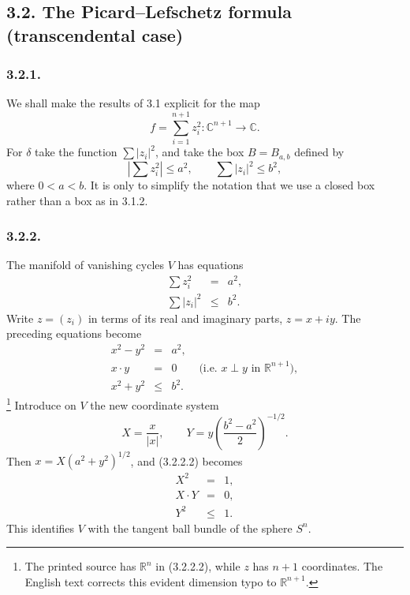 \subsection*{3.2. The Picard--Lefschetz formula (transcendental case)}

\subsubsection*{3.2.1.}
We shall make the results of 3.1 explicit for the map
\[
f=\sum_{i=1}^{n+1}z_i^2:\mathbb C^{n+1}\longrightarrow\mathbb C.
\]
For $\delta$ take the function $\sum |z_i|^2$, and take the box
$B=B_{a,b}$ defined by
\[
\left|\sum z_i^2\right|\leq a^2,
\qquad
\sum |z_i|^2\leq b^2,
\]
where $0<a<b$.  It is only to simplify the notation that we use a
closed box rather than a box as in 3.1.2.

\subsubsection*{3.2.2.}
The manifold of vanishing cycles $V$ has equations
\begin{equation}\tag{3.2.2.1}
\begin{array}{rcl}
\displaystyle\sum z_i^2&=&a^2,\\
\displaystyle\sum |z_i|^2&\leq&b^2.
\end{array}
\end{equation}
Write $z=(z_i)$ in terms of its real and imaginary parts,
$z=x+iy$.  The preceding equations become
\begin{equation}\tag{3.2.2.2}
\begin{array}{rcl}
x^2-y^2&=&a^2,\\
x\mathbin{\cdot}y&=&0
  \qquad\bigl(\text{i.e. }x\perp y\text{ in }\mathbb R^{n+1}\bigr),\\
x^2+y^2&\leq&b^2.
\end{array}
\end{equation}
\footnote{The printed source has $\mathbb R^n$ in (3.2.2.2), while
$z$ has $n+1$ coordinates.  The English text corrects this evident
dimension typo to $\mathbb R^{n+1}$.}
Introduce on $V$ the new coordinate system
\[
X=\frac{x}{|x|},
\qquad
Y=y\left(\frac{b^2-a^2}{2}\right)^{-1/2}.
\]
Then $x=X(a^2+y^2)^{1/2}$, and (3.2.2.2) becomes
\begin{equation}\tag{3.2.2.3}
\begin{array}{rcl}
X^2&=&1,\\
X\mathbin{\cdot}Y&=&0,\\
Y^2&\leq&1.
\end{array}
\end{equation}
This identifies $V$ with the tangent ball bundle of the sphere $S^n$.

